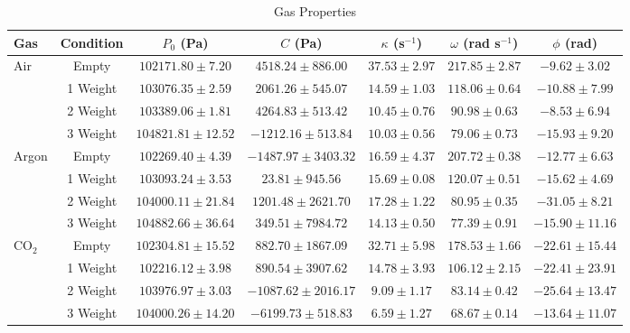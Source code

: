 \documentclass[lettersize,journal]{IEEEtran}
\begin{document}
	\begin{table}[!htbp]
		\centering
		\caption{Gas Properties}
		\label{tab:gas_properties}
		\begin{tabular}{lcccccc}
			\toprule
			Gas & Condition & $P_0$ (Pa) & $C$ (Pa) & $\kappa$ (s$^{-1}$) & $\omega$ (rad s$^{-1}$) & $\phi$ (rad) \\
			\midrule
			Air & Empty & $102171.80 \pm 7.20$ & $4518.24 \pm 886.00$ & $37.53 \pm 2.97$ & $217.85 \pm 2.87$ & $-9.62 \pm 3.02$ \\
			& 1 Weight & $103076.35 \pm 2.59$ & $2061.26 \pm 545.07$ & $14.59 \pm 1.03$ & $118.06 \pm 0.64$ & $-10.88 \pm 7.99$ \\
			& 2 Weight & $103389.06 \pm 1.81$ & $4264.83 \pm 513.42$ & $10.45 \pm 0.76$ & $90.98 \pm 0.63$ & $-8.53 \pm 6.94$ \\
			& 3 Weight & $104821.81 \pm 12.52$ & $-1212.16 \pm 513.84$ & $10.03 \pm 0.56$ & $79.06 \pm 0.73$ & $-15.93 \pm 9.20$ \\
			Argon & Empty & $102269.40 \pm 4.39$ & $-1487.97 \pm 3403.32$ & $16.59 \pm 4.37$ & $207.72 \pm 0.38$ & $-12.77 \pm 6.63$ \\
			& 1 Weight & $103093.24 \pm 3.53$ & $23.81 \pm 945.56$ & $15.69 \pm 0.08$ & $120.07 \pm 0.51$ & $-15.62 \pm 4.69$ \\
			& 2 Weight & $104000.11 \pm 21.84$ & $1201.48 \pm 2621.70$ & $17.28 \pm 1.22$ & $80.95 \pm 0.35$ & $-31.05 \pm 8.21$ \\
			& 3 Weight & $104882.66 \pm 36.64$ & $349.51 \pm 7984.72$ & $14.13 \pm 0.50$ & $77.39 \pm 0.91$ & $-15.90 \pm 11.16$ \\
			CO$_2$ & Empty & $102304.81 \pm 15.52$ & $882.70 \pm 1867.09$ & $32.71 \pm 5.98$ & $178.53 \pm 1.66$ & $-22.61 \pm 15.44$ \\
			& 1 Weight & $102216.12 \pm 3.98$ & $890.54 \pm 3907.62$ & $14.78 \pm 3.93$ & $106.12 \pm 2.15$ & $-22.41 \pm 23.91$ \\
			& 2 Weight & $103976.97 \pm 3.03$ & $-1087.62 \pm 2016.17$ & $9.09 \pm 1.17$ & $83.14 \pm 0.42$ & $-25.64 \pm 13.47$ \\
			& 3 Weight & $104000.26 \pm 14.20$ & $-6199.73 \pm 518.83$ & $6.59 \pm 1.27$ & $68.67 \pm 0.14$ & $-13.64 \pm 11.07$ \\
			\bottomrule
		\end{tabular}
	\end{table}
	
\end{document}
